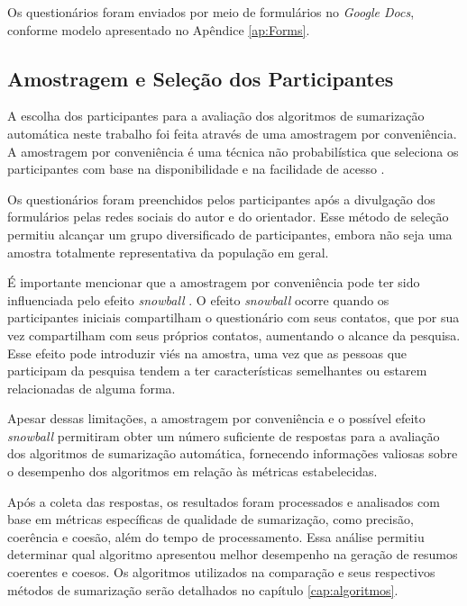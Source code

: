 Os questionários foram enviados por meio de formulários no \textit{Google Docs}, conforme modelo apresentado no Apêndice \ref{ap:Forms}.

\subsection{Amostragem e Seleção dos Participantes}
\label{subsec:amostragem}

A escolha dos participantes para a avaliação dos algoritmos de sumarização automática neste trabalho foi feita através de uma amostragem por conveniência. A amostragem por conveniência é uma técnica não probabilística que seleciona os participantes com base na disponibilidade e na facilidade de acesso \cite{neuman2006workbook}.

Os questionários foram preenchidos pelos participantes após a divulgação dos formulários pelas redes sociais do autor e do orientador. Esse método de seleção permitiu alcançar um grupo diversificado de participantes, embora não seja uma amostra totalmente representativa da população em geral.

É importante mencionar que a amostragem por conveniência pode ter sido influenciada pelo efeito \textit{snowball} \cite{goodman1961snowball}. O efeito \textit{snowball} ocorre quando os participantes iniciais compartilham o questionário com seus contatos, que por sua vez compartilham com seus próprios contatos, aumentando o alcance da pesquisa. Esse efeito pode introduzir viés na amostra, uma vez que as pessoas que participam da pesquisa tendem a ter características semelhantes ou estarem 
relacionadas de alguma forma.

Apesar dessas limitações, a amostragem por conveniência e o possível efeito \textit{snowball} permitiram obter um número suficiente de respostas para a avaliação dos algoritmos de sumarização automática, fornecendo informações valiosas sobre o desempenho dos algoritmos em relação às métricas estabelecidas.

Após a coleta das respostas, os resultados foram processados e analisados com base em métricas específicas de qualidade de sumarização, como precisão, coerência e coesão, além do tempo de processamento. Essa análise permitiu determinar qual algoritmo apresentou melhor desempenho na geração de resumos coerentes e coesos. Os algoritmos utilizados na comparação e seus respectivos métodos de sumarização serão detalhados no capítulo \ref{cap:algoritmos}.